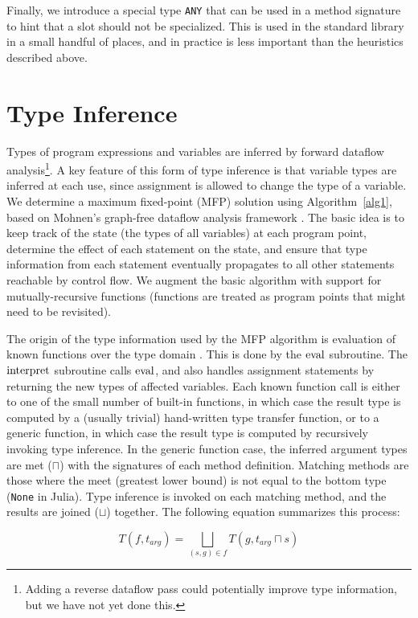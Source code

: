 Finally, we introduce a special type {\tt ANY} that can be used in a method
signature to hint that a slot should not be specialized. This is used in the
standard library in a small handful of places, and in practice is less
important than the heuristics described above.


\section{Type Inference}

Types of program expressions and variables are inferred by forward
dataflow analysis\footnote{Adding a reverse dataflow pass could potentially
improve type information, but we have not yet done this.}.
A key feature of this form of type inference is that variable types are
inferred at each use, since assignment is allowed to change the type of
a variable.
We determine a maximum fixed-point (MFP) solution using
Algorithm~\ref{alg1}, based on
Mohnen's graph-free dataflow analysis framework \cite{graphfree}. The basic
idea is to keep track of the state (the types of all variables) at each program
point, determine the effect of each statement on the state, and ensure that
type information from each statement eventually propagates to all other
statements reachable by control flow. We augment the basic algorithm with
support for mutually-recursive functions
(functions are treated as program points that might need to be revisited).

The origin of the type information used by the MFP algorithm is
evaluation of known functions over the type domain \cite{abstractinterp}.
This is done by the $\operatorname{eval}$ subroutine. The $\operatorname{interpret}$ subroutine calls
$\operatorname{eval}$, and also handles assignment statements by returning the new types
of affected variables. Each known function
call is either to one of the small number of built-in functions, in which
case the result type is computed by a (usually trivial) hand-written
type transfer function, or to a generic function, in which case the result
type is computed by recursively invoking type inference. In the generic
function case, the inferred argument types are met ($\sqcap$) with the
signatures of each method definition. Matching methods are those where the
meet (greatest lower bound)
is not equal to the bottom type ({\tt None} in Julia).
Type inference is invoked on each matching
method, and the results are joined ($\sqcup$) together. The following equation
summarizes this process:

\[
T(f,t_{arg}) = \bigsqcup_{(s,g) \in f}T(g,t_{arg} \sqcap s)
\]

